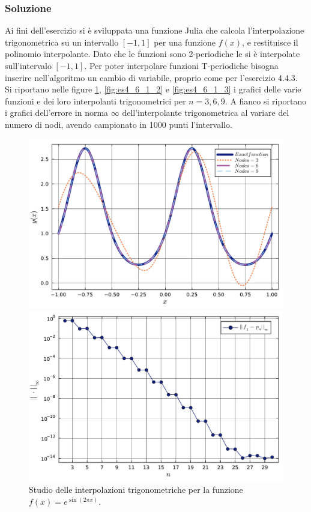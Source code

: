 \documentclass[letterpaper, 12pt]{article}
\numberwithin{equation}{section}    %
\begin{document}
\subsubsection{Soluzione}
Ai fini dell'esercizio si è sviluppata una funzione Julia che calcola l'interpolazione trigonometrica
su un intervallo $[-1, 1]$ per una funzione $f(x)$, e restituisce il polinomio interpolante. Dato che le funzioni
sono 2-periodiche le si è interpolate sull'intervalo $[-1, 1]$. Per poter interpolare funzioni 
T-periodiche bisogna inserire nell'algoritmo un cambio di variabile, proprio come per l'esercizio 4.4.3. \\
Si riportano nelle figure \ref{fig:es4_6_1_1}, \ref{fig:es4_6_1_2} e \ref{fig:es4_6_1_3} i grafici 
delle varie funzioni 
e dei loro interpolanti trigonometrici per $n=3,6,9$. A fianco si riportano i grafici 
dell'errore in norma $\infty$ dell'interpolante trigonometrica al variare del numero di nodi, avendo campionato 
in 1000 punti l'intervallo.
\begin{figure}[!ht]
    \centering
    \begin{minipage}[b]{0.47\textwidth}
        \includegraphics[width=\textwidth]{4611.pdf}
    \end{minipage}
    \hspace{0.5cm}
    \begin{minipage}[b]{0.47\textwidth}
        \includegraphics[width=\textwidth]{4612.pdf}
    \end{minipage}
    \caption{Studio delle interpolazioni trigonometriche per la funzione $f(x) = e^{\sin (2\pi x)}$.}
    \label{fig:es4_6_1_1}
\end{figure}
\end{document}
